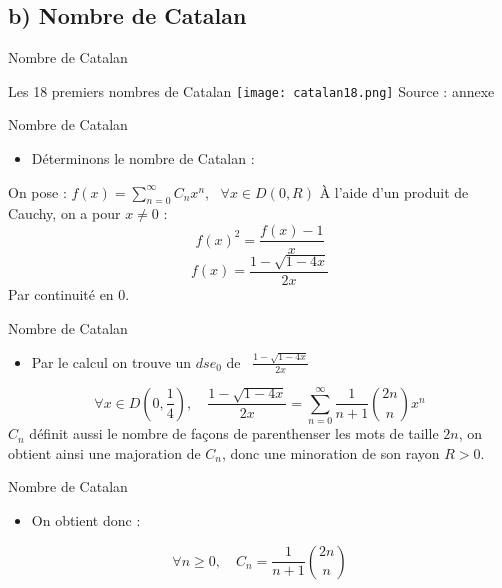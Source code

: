 \documentclass{beamer}
\begin{document}
\subsection{b) Nombre de Catalan}
\begin{frame}{Nombre de Catalan}
    \begin{center}{Les 18 premiers nombres de Catalan}
        \texttt{[image: catalan18.png]}
        \newline
        Source : annexe
    \end{center}
\end{frame}
\begin{frame}{Nombre de Catalan}
    \begin{itemize}
        \item  Déterminons le nombre de Catalan : \newline\newline
    \end{itemize}
    On pose : $f(x) = \displaystyle  \sum_{n=0}^{\infty}C_nx^{n}$, \ $\forall x \in D(0,R)$ \newline\newline
    À l'aide d'un produit de Cauchy, on a pour $x \neq 0$ : \newline\newline
    \begin{equation}
        f(x)^{2} = \frac{f(x) - 1}{x} 
    \end{equation}
    \begin{equation}
        f(x) = \frac{1 -\sqrt{1-4x}}{2x} 
    \end{equation}
    Par continuité en 0.
\end{frame}
\begin{frame}{Nombre de Catalan}
    \begin{itemize}
        \item Par le calcul on trouve un $dse_0$ de \ $\frac{1 -\sqrt{1-4x}}{2x}$ \newline \newline
    \end{itemize}
    \begin{equation}
        \forall x \in D(0,\frac{1}{4}), \quad  \frac{1 -\sqrt{1-4x}}{2x} = \sum_{n=0}^{\infty}\frac{1}{n+1}\binom{2n}{n}x^{n}
    \end{equation}
    \newline\newline
    $C_n$ définit aussi le nombre de façons de parenthenser les mots de taille $2n$, on obtient ainsi une majoration de $C_n$, donc une minoration de son rayon $R > 0$.
\end{frame}
\begin{frame}{Nombre de Catalan}
    \begin{itemize}
        \item On obtient donc :
    \end{itemize}
     \begin{equation}
        \forall n \geqslant 0, \quad C_n = \frac{1}{n+1}\binom{2n}{n}
    \end{equation}
\end{frame}
\end{document}
